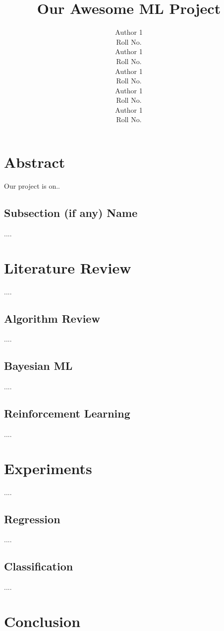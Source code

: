 \documentclass{article} %
\title{Our Awesome ML Project}
\author{
Author 1 \\
Roll No. \\
\And
Author 1 \\
Roll No. \\
\AND
Author 1 \\
Roll No. \\
\And
Author 1 \\
Roll No. \\
\And
Author 1 \\
Roll No. \\
}
\begin{document}



\section{Abstract}

Our project is on..

\subsection{Subsection (if any) Name}

....

\section{Literature Review}

....

\subsection{Algorithm Review}

....

\subsection{Bayesian ML}

....

\subsection{Reinforcement Learning}

....

\section{Experiments}

....

\subsection{Regression}

....

\subsection{Classification}

....

\section{Conclusion}
\end{document}
